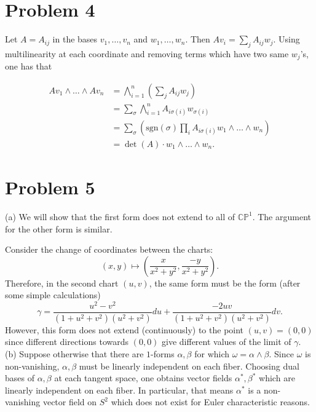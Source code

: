 \documentclass{amsart}
\numberwithin{equation}{section}
\theoremstyle{plain}
\theoremstyle{definition}
\theoremstyle{remark}
\renewcommand{\_}[2]{\underbrace{#1}_{#2}}
\renewcommand{\^}[2]{\overbrace{#1}_{#2}}
\renewcommand{\P}{\mathbb{P}}
\newcommand{\C}{\mathbb{C}}
\begin{document}
\section*{Problem 4}
Let $A = A_{ij}$ in the bases $v_1, \dots, v_n$ and $w_1, \dots, w_n$. Then $Av_i = \sum_j A_{ij}w_j$. Using multilinearity at each coordinate and removing terms which have two same $w_j$'s, one has that

\begin{align*}
  Av_1 \wedge \dots \wedge Av_n &= \bigwedge_{i=1}^n\left (\sum_j A_{ij}w_j\right )\\
                                &= \sum_\sigma \bigwedge_{i=1}^n A_{i\sigma(i)}w_{\sigma(i)} \\
                                &= \sum_\sigma \left (\mathrm{sgn}(\sigma)\prod_i A_{i\sigma(i)} w_1 \wedge \dots \wedge w_n \right)\\
                                &= \det (A)\cdot w_1\wedge \dots \wedge w_n.
\end{align*}

\section*{Problem 5}
(a) We will show that the first form does not extend to all of $\C\P^1$. The argument for the other form is similar.

Consider the change of coordinates between the charts: \[(x,y) \mapsto \left( \frac x{x^2 + y^2}, \frac{-y}{x^2+y^2} \right ).\] Therefore, in the second chart $(u,v)$, the same form must be the form (after some simple calculations) \[ \gamma = \frac {u^2 - v^2}{(1+u^2+v^2)(u^2+v^2)}du + \frac{-2uv}{(1+u^2+v^2)(u^2+v^2)}dv.\] However, this form does not extend (continuously) to the point $(u,v) = (0,0)$ since different directions towards $(0,0)$ give different values of the limit of $\gamma$.\\

(b) Suppose otherwise that there are $1$-forms $\alpha, \beta$ for which $\omega = \alpha \wedge \beta$. Since $\omega$ is non-vanishing, $\alpha, \beta$ must be linearly independent on each fiber. Choosing dual bases of $\alpha, \beta$ at each tangent space, one obtains vector fields $\alpha^*, \beta^*$ which are linearly independent on each fiber. In particular, that means $\alpha^*$ is a non-vanishing vector field on $S^2$ which does not exist for Euler characteristic reasons.
\end{document}
